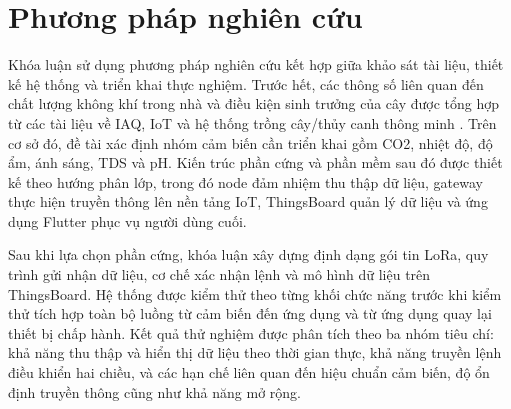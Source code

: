 \section{Phương pháp nghiên cứu}
Khóa luận sử dụng phương pháp nghiên cứu kết hợp giữa khảo sát tài liệu, thiết kế hệ thống và triển khai thực nghiệm. Trước hết, các thông số liên quan đến chất lượng không khí trong nhà và điều kiện sinh trưởng của cây được tổng hợp từ các tài liệu về IAQ, IoT và hệ thống trồng cây/thủy canh thông minh \cite{who_air_pollution,epa_iaq,bose_iot_hydroponics}. Trên cơ sở đó, đề tài xác định nhóm cảm biến cần triển khai gồm CO2, nhiệt độ, độ ẩm, ánh sáng, TDS và pH. Kiến trúc phần cứng và phần mềm sau đó được thiết kế theo hướng phân lớp, trong đó node đảm nhiệm thu thập dữ liệu, gateway thực hiện truyền thông lên nền tảng IoT, ThingsBoard quản lý dữ liệu và ứng dụng Flutter phục vụ người dùng cuối.

Sau khi lựa chọn phần cứng, khóa luận xây dựng định dạng gói tin LoRa, quy trình gửi nhận dữ liệu, cơ chế xác nhận lệnh và mô hình dữ liệu trên ThingsBoard. Hệ thống được kiểm thử theo từng khối chức năng trước khi kiểm thử tích hợp toàn bộ luồng từ cảm biến đến ứng dụng và từ ứng dụng quay lại thiết bị chấp hành. Kết quả thử nghiệm được phân tích theo ba nhóm tiêu chí: khả năng thu thập và hiển thị dữ liệu theo thời gian thực, khả năng truyền lệnh điều khiển hai chiều, và các hạn chế liên quan đến hiệu chuẩn cảm biến, độ ổn định truyền thông cũng như khả năng mở rộng.
